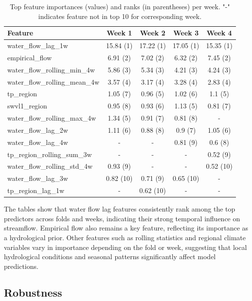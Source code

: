 \documentclass[a4paper,12pt]{article}
\begin{document}
\begin{table}[ht]
\centering
\begin{tabular}{lcccc}
\hline
\textbf{Feature} & \textbf{Week 1} & \textbf{Week 2} & \textbf{Week 3} & \textbf{Week 4} \\ 
\hline
water\_flow\_lag\_1w & 15.84 (1) & 17.22 (1) & 17.05 (1) & 15.35 (1) \\
empirical\_flow & 6.91 (2) & 7.02 (2) & 6.32 (2) & 7.45 (2) \\
water\_flow\_rolling\_min\_4w & 5.86 (3) & 5.34 (3) & 4.21 (3) & 4.24 (3) \\
water\_flow\_rolling\_mean\_4w & 3.57 (4) & 3.17 (4) & 3.28 (4) & 2.83 (4) \\
tp\_region & 1.05 (7) & 0.96 (5) & 1.02 (6) & 1.1 (5) \\
swvl1\_region & 0.95 (8) & 0.93 (6) & 1.13 (5) & 0.81 (7) \\
water\_flow\_rolling\_max\_4w & 1.34 (5) & 0.91 (7) & 0.81 (8) & - \\
water\_flow\_lag\_2w & 1.11 (6) & 0.88 (8) & 0.9 (7) & 1.05 (6) \\
water\_flow\_lag\_4w & - & - & 0.81 (9) & 0.6 (8) \\
tp\_region\_rolling\_sum\_3w & - & - & - & 0.52 (9) \\
water\_flow\_rolling\_std\_4w & 0.93 (9) & - & - & 0.52 (10) \\
water\_flow\_lag\_3w & 0.82 (10) & 0.71 (9) & 0.65 (10) & - \\
tp\_region\_lag\_1w & - & 0.62 (10) & - & - \\
\hline
\end{tabular}
\caption{Top feature importances (values) and ranks (in parentheses) per week. "-" indicates feature not in top 10 for corresponding week.}
\label{tab:feat_importance_ranks_weeks}   
\end{table}
\noindent The tables show that water flow lag features consistently rank among the top predictors across folds and weeks, indicating their strong temporal influence on streamflow. Empirical flow also remains a key feature, reflecting its importance as a hydrological prior. Other features such as rolling statistics and regional climate variables vary in importance depending on the fold or week, suggesting that local hydrological conditions and seasonal patterns significantly affect model predictions.

\subsection{Robustness}
\label{sec:robustness}
\end{document}

